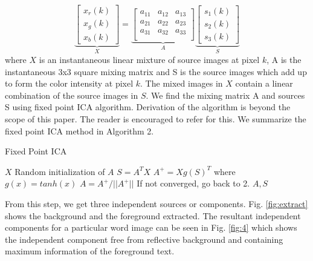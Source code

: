 \begin{equation}
\underbrace{\left[ {\begin{array}{c}
{x_r(k)} \\
{x_g(k)} \\
{x_b(k)}
 \end{array} } \right]}_{X}
=
\underbrace{\left[ {\begin{array}{ccc}
a_{11} & a_{12} & a_{13} \\
a_{21} & a_{22} & a_{23} \\
a_{31} & a_{32} & a_{33} \\
 \end{array} } \right]}_{A}
\underbrace{\left[ {\begin{array}{c}
s_1(k)\\s_2(k)\\ s_3(k)
 \end{array} } \right]}_{S}
\end{equation} where $X$ is an instantaneous linear mixture of source
images at pixel $k$, A is the instantaneous $3$x$3$ square mixing matrix and S
is the source images which add up to form the color intensity 
at pixel $k$.  
The mixed images
in $X$ contain a linear combination of the source
images in $S$. We find the mixing matrix A and sources S using fixed point ICA
algorithm.
Derivation of the algorithm is beyond the scope of this paper.
The reader is encouraged to refer \cite{A11} for this. We summarize the 
fixed point ICA method in Algorithm 2.

\begin{algorithm}[t]
\caption{Fixed Point ICA}
\begin{algorithmic}[1] 
\REQUIRE $X$
\STATE Random initialization of $A$
\STATE $S=A^TX$
\STATE $A^+=Xg(S)^T$
where $g(x)=tanh(x)$ 
\STATE $A=A^+/||A^+||$  
\STATE If not converged, go back to 2.
\ENSURE $A,S$ 
\end{algorithmic}
\end{algorithm} 
From this step, we get three independent sources or components.
Fig. \ref{fig:extract} shows the background and the foreground extracted.
The resultant independent components for a particular word image can be seen in 
Fig. \ref{fig:4} which shows the independent component free from reflective background 
and containing maximum information of the foreground text.

